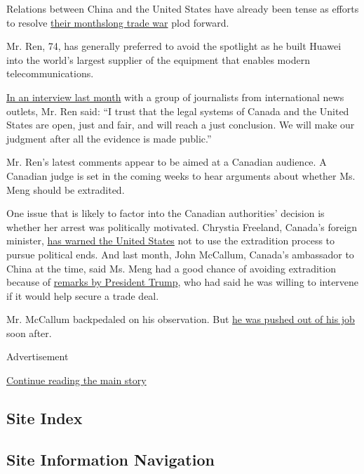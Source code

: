 Relations between China and the United States have already been tense as
efforts to resolve
\href{https://www.nytimes.com/2019/02/15/business/trump-china-us-trade.html}{their
monthslong trade war} plod forward.

Mr. Ren, 74, has generally preferred to avoid the spotlight as he built
Huawei into the world's largest supplier of the equipment that enables
modern telecommunications.

\href{https://www.nytimes.com/2019/01/15/technology/huawei-ren-zhengfei.html}{In
an interview last month} with a group of journalists from international
news outlets, Mr. Ren said: ``I trust that the legal systems of Canada
and the United States are open, just and fair, and will reach a just
conclusion. We will make our judgment after all the evidence is made
public.''

Mr. Ren's latest comments appear to be aimed at a Canadian audience. A
Canadian judge is set in the coming weeks to hear arguments about
whether Ms. Meng should be extradited.

One issue that is likely to factor into the Canadian authorities'
decision is whether her arrest was politically motivated. Chrystia
Freeland, Canada's foreign minister,
\href{https://www.nytimes.com/2018/12/13/world/canada/china-huawei.html}{has
warned the United States} not to use the extradition process to pursue
political ends. And last month, John McCallum, Canada's ambassador to
China at the time, said Ms. Meng had a good chance of avoiding
extradition because of
\href{https://www.nytimes.com/2018/12/12/us/politics/trump-meng-wanzhou-huawei-extradition.html}{remarks
by President Trump}, who had said he was willing to intervene if it
would help secure a trade deal.

Mr. McCallum backpedaled on his observation. But
\href{https://www.nytimes.com/2019/01/26/world/americas/canada-ambassador-china-huawei.html}{he
was pushed out of his job} soon after.

Advertisement

\protect\hyperlink{after-bottom}{Continue reading the main story}

\hypertarget{site-index}{%
\subsection{Site Index}\label{site-index}}

\hypertarget{site-information-navigation}{%
\subsection{Site Information
Navigation}\label{site-information-navigation}}

